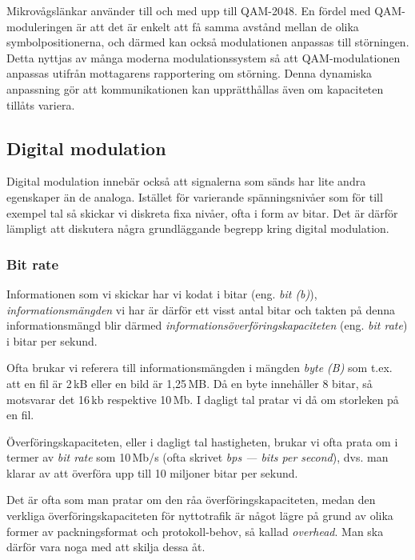 Mikrovågslänkar använder till och med upp till QAM-2048. En fördel med
QAM-moduleringen är att det är enkelt att få samma avstånd mellan de
olika symbolpositionerna, och därmed kan också modulationen anpassas
till störningen. Detta nyttjas av många moderna modulationssystem så
att QAM-modulationen anpassas utifrån mottagarens rapportering om
störning.  Denna dynamiska anpassning gör att kommunikationen kan
upprätthållas även om kapaciteten tillåts variera.

\subsection{Digital modulation}

Digital modulation innebär också att signalerna som sänds har lite
andra egenskaper än de analoga. Istället för varierande
spänningsnivåer som för till exempel tal så skickar vi diskreta fixa
nivåer, ofta i form av bitar. Det är därför lämpligt att diskutera
några grundläggande begrepp kring digital modulation.

\subsubsection{Bit rate}

Informationen som vi skickar har vi kodat i bitar (eng. \emph{bit (b)}),
\emph{informationsmängden} vi har är därför ett visst antal bitar och takten på
denna informationsmängd blir därmed \emph{informationsöverföringskapaciteten}
(eng. \emph{bit rate}) i bitar per sekund.

Ofta brukar vi referera till informationsmängden i mängden \emph{byte (B)}
som t.ex. att en fil är 2\,kB eller en bild är 1,25\,MB. Då en byte innehåller
8 bitar, så motsvarar det 16\,kb respektive 10\,Mb.
I dagligt tal pratar vi då om storleken på en fil.

Överföringskapaciteten, eller i dagligt tal hastigheten, brukar vi ofta prata
om i termer av \emph{bit rate} som 10\,Mb/s (ofta skrivet \emph{bps --- bits per
second}), dvs. man klarar av att överföra upp till 10 miljoner bitar per sekund.

Det är ofta som man pratar om den råa överföringskapaciteten, medan den
verkliga överföringskapaciteten för nyttotrafik är något lägre på grund av
olika former av packningsformat och protokoll-behov, så kallad \emph{overhead}.
Man ska därför vara noga med att skilja dessa åt.

